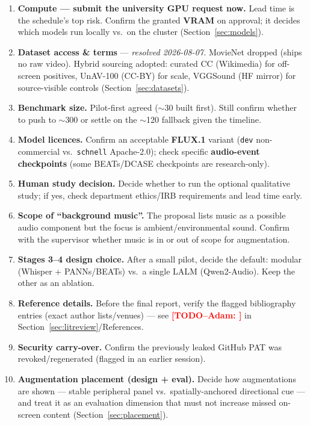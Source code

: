 \documentclass[11pt,a4paper]{article}
\newcommand{\TODO}[1]{\textcolor{red}{\textbf{[TODO--Adam: #1]}}}
\begin{document}
\begin{enumerate}[label=\textbf{A\arabic*.}]
  \item \textbf{Compute --- submit the university GPU request now.} Lead time is the schedule's top
    risk. Confirm the granted \textbf{VRAM} on approval; it decides which models run locally vs.\ on
    the cluster (Section~\ref{sec:models}).
  \item \textbf{Dataset access \& terms} --- \emph{resolved 2026-08-07.} MovieNet dropped (ships no
    raw video). Hybrid sourcing adopted: curated CC (Wikimedia) for off-screen positives, UnAV-100
    (CC-BY) for scale, VGGSound (HF mirror) for source-visible controls (Section~\ref{sec:datasets}).
  \item \textbf{Benchmark size.} Pilot-first agreed ($\sim$30 built first). Still confirm whether to
    push to $\sim$300 or settle on the $\sim$120 fallback given the timeline.
  \item \textbf{Model licences.} Confirm an acceptable \textbf{FLUX.1} variant (\texttt{dev}
    non-commercial vs.\ \texttt{schnell} Apache-2.0); check specific \textbf{audio-event checkpoints}
    (some BEATs/DCASE checkpoints are research-only).
  \item \textbf{Human study decision.} Decide whether to run the optional qualitative study; if yes,
    check department ethics/IRB requirements and lead time early.
  \item \textbf{Scope of ``background music''.} The proposal lists music as a possible audio
    component but the focus is ambient/environmental sound. Confirm with the supervisor whether music
    is in or out of scope for augmentation.
  \item \textbf{Stages 3--4 design choice.} After a small pilot, decide the default: modular
    (Whisper + PANNs/BEATs) vs.\ a single LALM (Qwen2-Audio). Keep the other as an ablation.
  \item \textbf{Reference details.} Before the final report, verify the flagged bibliography entries
    (exact author lists/venues) --- see \TODO{} in Section~\ref{sec:litreview}/References.
  \item \textbf{Security carry-over.} Confirm the previously leaked GitHub PAT was revoked/regenerated
    (flagged in an earlier session).
  \item \textbf{Augmentation placement (design + eval).} Decide how augmentations are shown ---
    stable peripheral panel vs.\ spatially-anchored directional cue --- and treat it as an evaluation
    dimension that must not increase missed on-screen content (Section~\ref{sec:placement}).

\end{enumerate}
\end{document}
